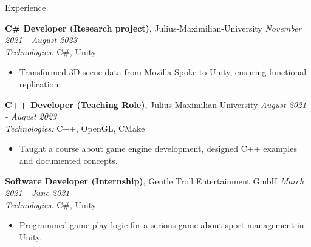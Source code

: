 \documentclass{resume} %
\begin{document}
\begin{rSection}{Experience}
{\small
{\bf C\# Developer (Research project)}{, Julius-Maximilian-University} \hfill {\em November 2021 - August 2023}\\
{\small {\em Technologies:} C\#, Unity} 
\begin{itemize}
    \item \small Transformed 3D scene data from Mozilla Spoke to Unity, ensuring functional replication.
\end{itemize}
}
{\small
{\bf C++ Developer (Teaching Role)}{, Julius-Maximilian-University} \hfill {\em August 2021 - August 2023}\\
{\small {\em Technologies:} C++, OpenGL, CMake}
\begin{itemize}
    \item \small Taught a course about game engine development, designed C++ examples and documented concepts.
\end{itemize}
}
{\small
{\bf Software Developer (Internship)}{, Gentle Troll Entertainment GmbH} \hfill {\em March 2021 - June 2021}\\
{\small {\em Technologies:} C\#, Unity}
\begin{itemize}
    \item \small Programmed game play logic for a serious game about sport management in Unity.
\end{itemize}
}
\end{rSection}
\end{document}
